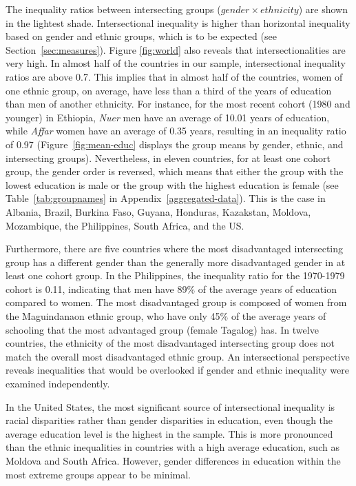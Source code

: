 The inequality ratios between intersecting groups ($gender \times ethnicity$) are shown in the lightest shade. Intersectional inequality is higher than horizontal inequality based on gender and ethnic groups, which is to be expected (see Section~\ref{sec:measures}). Figure \ref{fig:world} also reveals that intersectionalities are very high. In almost half of the countries in our sample, intersectional inequality ratios are above 0.7. This implies that in almost half of the countries, women of one ethnic group, on average, have less than a third of the years of education than men of another ethnicity. For instance, for the most recent cohort (1980 and younger) in Ethiopia, \textit{Nuer} men have an average of 10.01 years of education, while \textit{Affar} women have an average of 0.35 years, resulting in an inequality ratio of 0.97 (Figure~\ref{fig:mean-educ} displays the group means by gender, ethnic, and intersecting groups). Nevertheless, in eleven countries, for at least one cohort group, the gender order is reversed, which means that either the group with the lowest education is male or the group with the highest education is female (see Table~\ref{tab:groupnames} in Appendix~\ref{aggregated-data}). This is the case in Albania, Brazil, Burkina Faso, Guyana, Honduras, Kazakstan, Moldova, Mozambique, the Philippines, South Africa, and the US.

Furthermore, there are five countries where the most disadvantaged intersecting group has a different gender than the generally more disadvantaged gender in at least one cohort group. In the Philippines, the inequality ratio for the 1970-1979 cohort is 0.11, indicating that men have 89\% of the average years of education compared to women. The most disadvantaged group is composed of women from the Maguindanaon ethnic group, who have only 45\% of the average years of schooling that the most advantaged group (female Tagalog) has. In twelve countries, the ethnicity of the most disadvantaged intersecting group does not match the overall most disadvantaged ethnic group. An intersectional perspective reveals inequalities that would be overlooked if gender and ethnic inequality were examined independently.

In the United States, the most significant source of intersectional inequality is racial disparities rather than gender disparities in education, even though the average education level is the highest in the sample. This is more pronounced than the ethnic inequalities in countries with a high average education, such as Moldova and South Africa. However, gender differences in education within the most extreme groups appear to be minimal.

